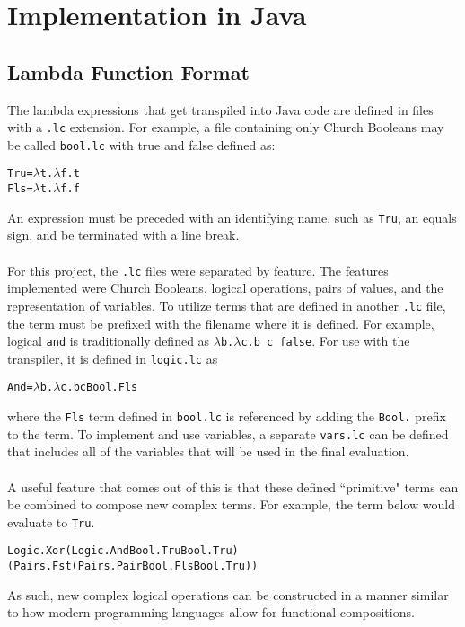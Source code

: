 \documentclass[11pt]{article}
\begin{document}
\section{Implementation in Java}

\subsection{Lambda Function Format}

The lambda expressions that get transpiled into Java code are defined in files with a \texttt{.lc} extension. For example, a file containing only Church Booleans may be called \texttt{bool.lc} with true and false defined as:
\begin{alltt}
Tru = \(\lambda\)t.\(\lambda\)f.t
Fls = \(\lambda\)t.\(\lambda\)f.f
\end{alltt}
An expression must be preceded with an identifying name, such as \texttt{Tru}, an equals sign, and be terminated with a line break.
\\
\\
For this project, the \texttt{.lc} files were separated by feature. The features implemented were Church Booleans, logical operations, pairs of values, and the representation of variables. To utilize terms that are defined in another \texttt{.lc} file, the term must be prefixed with the filename where it is defined. For example, logical \texttt{and} is traditionally defined as \texttt{\(\lambda\)b.\(\lambda\)c.b c false}. For use with the transpiler, it is defined in \texttt{logic.lc} as
\begin{alltt}
And = \(\lambda\)b.\(\lambda\)c.b c Bool.Fls
\end{alltt}
where the \texttt{Fls} term defined in \texttt{bool.lc} is referenced by adding the \texttt{Bool.} prefix to the term. To implement and use variables, a separate \texttt{vars.lc} can be defined that includes all of the variables that will be used in the final evaluation.
\\
\\
A useful feature that comes out of this is that these defined ``primitive" terms can be combined to compose new complex terms. For example, the term below would evaluate to \texttt{Tru}.
\begin{alltt}
Logic.Xor (Logic.And Bool.Tru Bool.Tru) (Pairs.Fst (Pairs.Pair Bool.Fls Bool.Tru))
\end{alltt}
As such, new complex logical operations can be constructed in a manner similar to how modern programming languages allow for functional compositions. 
\end{document}
